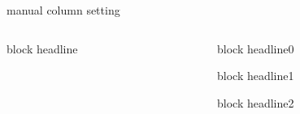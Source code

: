 \documentclass[final]{beamer}
\begin{document}
\begin{frame}{manual column setting}
\begin{columns}

\begin{column}{0.55\textwidth}
\begin{block}{block headline}
\lipsum
\end{block}
\end{column}

\begin{column}{0.43\textwidth}
\begin{block}{block headline0}
\lipsum[0]
\end{block}

\begin{block}{block headline1}
\lipsum[1]
\end{block}

\begin{block}{block headline2}
\lipsum[2]
\end{block}


\end{column}
\end{columns}

\end{frame}
\end{document}
